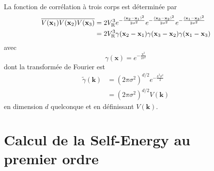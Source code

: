 La fonction de corrélation à trois corps est déterminée par
\begin{align}
\overline{V(\mathbf{x}_{\mathrm{1}})V(\mathbf{x}_{\mathrm{2}})V(\mathbf{x}_{\mathrm{3}})}&= 2V_{\mathrm{R}}^3 e^{-\frac{(\mathbf{x}_{\mathrm{2}}-\mathbf{x}_{\mathrm{1}})^2}{2\sigma^2}}e^{-\frac{(\mathbf{x}_{\mathrm{3}}-\mathbf{x}_{\mathrm{2}})^2}{2\sigma^2}}e^{-\frac{(\mathbf{x}_{\mathrm{1}}-\mathbf{x}_{\mathrm{3}})^2}{2\sigma^2}} \\ 
&=2V_{\mathrm{R}}^3 \gamma(\mathbf{x}_{\mathrm{2}}-\mathbf{x}_{\mathrm{1}})\gamma(\mathbf{x}_{\mathrm{3}}-\mathbf{x}_{\mathrm{2}})\gamma(\mathbf{x}_{\mathrm{1}}-\mathbf{x}_{\mathrm{3}})
\end{align}
avec 
\begin{equation}
\gamma(\mathbf{x})=e^{-\frac{\mathrm{x}^2}{2\sigma^2}}
\end{equation}
dont la transformée de Fourier est
\begin{align}
\tilde{\gamma}(\mathbf{k}) &= (2\pi \sigma^2)^{d/2} e^{-\frac{k^2\sigma^2}{2}} \\
&= (2\pi \sigma^2)^{d/2} V(\mathbf{k})
\end{align}
en dimension $d$ quelconque et en définissant $V(\mathbf{k})$.

\section{Calcul de la Self-Energy au premier ordre}

